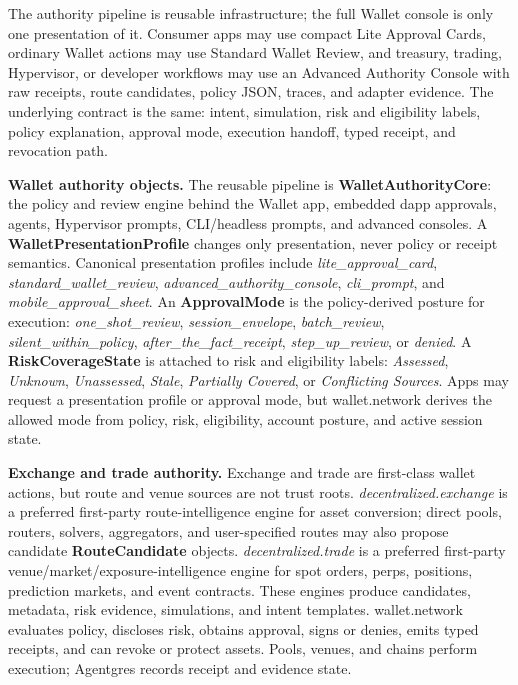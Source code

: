 \documentclass[
  11pt,
]{article}
\begin{document}
The authority pipeline is reusable infrastructure; the full Wallet
console is only one presentation of it. Consumer apps may use compact
Lite Approval Cards, ordinary Wallet actions may use Standard Wallet
Review, and treasury, trading, Hypervisor, or developer workflows may
use an Advanced Authority Console with raw receipts, route candidates,
policy JSON, traces, and adapter evidence. The underlying contract is
the same: intent, simulation, risk and eligibility labels, policy
explanation, approval mode, execution handoff, typed receipt, and
revocation path.

\textbf{Wallet authority objects.} The reusable pipeline is
\textbf{WalletAuthorityCore}: the policy and review engine behind the
Wallet app, embedded dapp approvals, agents, Hypervisor prompts,
CLI/headless prompts, and advanced consoles. A
\textbf{WalletPresentationProfile} changes only presentation, never
policy or receipt semantics. Canonical presentation profiles include
\emph{lite\_approval\_card}, \emph{standard\_wallet\_review},
\emph{advanced\_authority\_console}, \emph{cli\_prompt}, and
\emph{mobile\_approval\_sheet}. An \textbf{ApprovalMode} is the
policy-derived posture for execution: \emph{one\_shot\_review},
\emph{session\_envelope}, \emph{batch\_review},
\emph{silent\_within\_policy}, \emph{after\_the\_fact\_receipt},
\emph{step\_up\_review}, or \emph{denied}. A
\textbf{RiskCoverageState} is attached to risk and eligibility labels:
\emph{Assessed}, \emph{Unknown}, \emph{Unassessed}, \emph{Stale},
\emph{Partially Covered}, or \emph{Conflicting Sources}. Apps may
request a presentation profile or approval mode, but wallet.network
derives the allowed mode from policy, risk, eligibility, account
posture, and active session state.

\textbf{Exchange and trade authority.} Exchange and trade are
first-class wallet actions, but route and venue sources are not trust
roots. \emph{decentralized.exchange} is a preferred first-party
route-intelligence engine for asset conversion; direct pools, routers,
solvers, aggregators, and user-specified routes may also propose
candidate \textbf{RouteCandidate} objects.
\emph{decentralized.trade} is a preferred first-party
venue/market/exposure-intelligence engine for spot orders, perps,
positions, prediction markets, and event contracts. These engines
produce candidates, metadata, risk evidence, simulations, and intent
templates. wallet.network evaluates policy, discloses risk, obtains
approval, signs or denies, emits typed receipts, and can revoke or
protect assets. Pools, venues, and chains perform execution; Agentgres
records receipt and evidence state.
\end{document}
